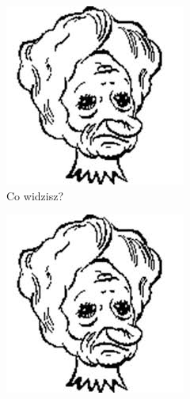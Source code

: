 \documentclass{article}
\begin{document}
\begin{figure}[h!]
  \centering
  \begin{subfigure}[b]{0.4\linewidth}
    \includegraphics[width=\linewidth]{images.jpg}
    \caption{Co widzisz?}
  \end{subfigure}
  \begin{subfigure}[b]{0.4\linewidth}
    \includegraphics[width=\linewidth,  angle=55]{images.jpg}

\end{subfigure}
\end{figure}
\end{document}
